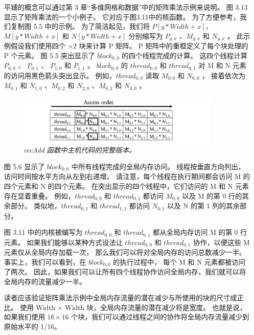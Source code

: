 平铺的概念可以通过第 3 章“多维网格和数据”中的矩阵乘法示例来说明。 图 3.13 显示了矩阵乘法的一个小例子。 
它对应于图3.11中的核函数。 为了方便参考，我们复制图 5.5 中的示例。 
为了简洁起见，我们将 $P[y * Width+x]$、$M[y * Width+x]$ 和 $N[y * Width+x]$ 
分别缩写为 $P_{y,x}$ 、$M_{y, x}$ 和 $N_{y,x}$ 。 
此示例假设我们使用四个 $\times 2$ 块来计算 P 矩阵。 P 矩阵中的重框定义了每个块处理的 P 个元素。 
图 5.5 突出显示了 $block_{0,0}$ 的四个线程完成的计算。 
这四个线程计算 $P_{0,0}$ 、 $P_{0,1}$ 、 $P_{1,0}$ 和 $P_{1,1}$ 。 
$block_{0,0}$ 的 $thread_{0,0}$ 和 $thread_{0,1}$ 对 M 和 N 元素的访问用黑色箭头突出显示。 
例如，$thread_{0,0}$ 读取 $M_{0,0}$ 和 $N_{0,0}$ ，
接着依次为 $M_{0,1}$ 和 $N_{1,0}$ 、$M_{0,2}$ 和 $N_{2,0}$ 、$M_{0,3}$ 和 $N_{3,0}$ 。

\begin{figure}[H]
	\centering
	\includegraphics[width=0.9\textwidth]{figs/F5.6.png}
	\caption{\textit{\color{red} vecAdd 函数中主机代码的完整版本。}}
\end{figure}

图 5.6 显示了 $block_{0,0}$ 中所有线程完成的全局内存访问。 线程按垂直方向列出，访问时间按水平方向从左到右递增。 
请注意，每个线程在执行期间都会访问 M 的四个元素和 N 的四个元素。 
在突出显示的四个线程中，它们访问的 M 和 N 元素存在显着重叠。 
例如，$thread_{0,0}$ 和 $thread_{0,1}$ 都访问 $M_{0,0}$ 以及 M 的第 0 行的其余部分。
类似地，$thread_{0,1}$ 和 $thread_{1,1}$ 都访问 $N_{0,1}$ 以及 N 的第 1 列的其余部分。

图 3.11 中的内核被编写为 $thread_{0,0}$ 和 $thread_{0,1}$ 都从全局内存访问 M 的第 0 行元素。 
如果我们能够以某种方式设法让 $thread_{0,0}$ 和 $thread_{0,1}$ 协作，以便这些 M 元素仅从全局内存加载一次，
那么我们可以将对全局内存的访问总数减少一半。 事实上，我们可以看到，在 $block_{0,0}$ 的执行过程中，
每个 M 和 N 元素都被访问了两次。 因此，如果我们可以让所有四个线程协作访问全局内存，我们就可以将全局内存的流量减少一半。

读者应该验证矩阵乘法示例中全局内存流量的潜在减少与所使用的块的尺寸成正比。 
使用 Width $\times$ Width 块，全局内存流量的潜在减少将是宽度。 
也就是说，如果我们使用 $16 \times 16$ 个块，我们可以通过线程之间的协作将全局内存流量减少到原始水平的 1/16。


